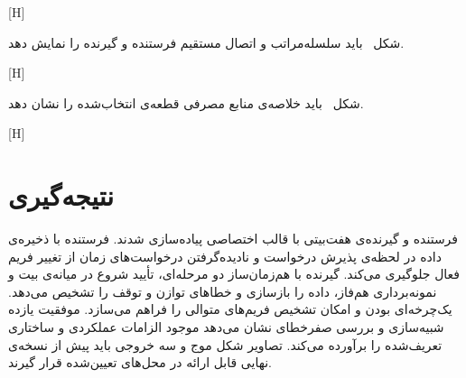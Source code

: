 [H]

شکل~ باید سلسله‌مراتب  و اتصال مستقیم فرستنده و گیرنده
را نمایش دهد.

[H]

شکل~ باید خلاصه‌ی منابع مصرفی قطعه‌ی انتخاب‌شده را نشان دهد.

[H]

\section{نتیجه‌گیری}

فرستنده و گیرنده‌ی  هفت‌بیتی با قالب اختصاصی  پیاده‌سازی
شدند. فرستنده با ذخیره‌ی داده در لحظه‌ی پذیرش درخواست و نادیده‌گرفتن درخواست‌های زمان
 از تغییر فریم فعال جلوگیری می‌کند. گیرنده با هم‌زمان‌ساز دو مرحله‌ای، تأیید شروع
در میانه‌ی بیت و نمونه‌برداری هم‌فاز، داده را بازسازی و خطاهای توازن و توقف را تشخیص می‌دهد.
یک‌چرخه‌ای بودن  و  امکان تشخیص فریم‌های متوالی را
فراهم می‌سازد. موفقیت یازده شبیه‌سازی و بررسی صفرخطای  نشان می‌دهد 
موجود الزامات عملکردی و ساختاری تعریف‌شده را برآورده می‌کند. تصاویر شکل موج و سه خروجی
 باید پیش از نسخه‌ی نهایی قابل ارائه در محل‌های تعیین‌شده قرار گیرند.
